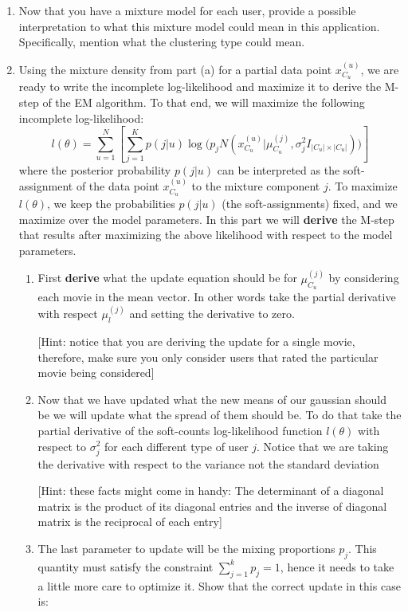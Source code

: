 \begin{enumerate}
\begin{enumerate}
 .


 \item Now that you have a mixture model for each user, provide a possible interpretation to what this mixture model could mean in this application. Specifically, mention what the clustering type could mean.

\item Using the mixture density from part (a) for a partial data point $x^{(u)}_{C_u}$, we are ready to write the incomplete log-likelihood and maximize it to derive the M-step of the EM algorithm.
To that end, we will maximize the following incomplete log-likelihood:
$$ l(\theta) = \sum_{u=1}^N \left[ \sum^{K}_{j=1} p(j|u) \log\bigl( p_j N(x^{(u)}_{C_u} | \mu^{(j)}_{C_u}, \sigma^2_j I_{|C_u| \times |C_u|} ) \bigr) \right]$$
where the posterior probability $p(j|u)$ can be interpreted as the soft-assignment of the data point $x^{(u)}_{C_u}$ to the mixture component $j$. To maximize $l( \theta)$, we keep the probabilities $p(j|u)$ (the soft-assignments) fixed, and we maximize over the model parameters. In this part we will \textbf{derive} the M-step that results after maximizing the above likelihood with respect to the model parameters.

\begin{enumerate}
\item  First {\bf derive } what the update equation should be for $\mu^{(j)}_{C_u}$ by considering each movie in the mean vector. In other words take the partial derivative with respect $\mu^{(j)}_{l}$ and setting the derivative to zero.

[Hint: notice that you are deriving the update for a single movie, therefore, make sure you only consider users that rated the particular movie being considered]
\item Now that we have updated what the new means of our gaussian should be we will update what the spread of them should be.
To do that take the partial derivative of the soft-counts log-likelihood function $l(\theta)$ with respect to $ \sigma^2_{j} $ for each different type of user $j$.
Notice that we are taking the derivative with respect to the variance not the standard deviation

[Hint: these facts might come in handy: The determinant of a diagonal matrix is the product of its diagonal entries and the inverse of diagonal matrix is the reciprocal of each entry]
\item The last parameter to update will be the mixing proportions $p_j$. This quantity must satisfy the constraint $ \sum^{k}_{j=1} p_j = 1$, hence it needs to take a little more care to optimize it. Show that the correct update in this case is:


\end{enumerate}
\end{enumerate}
\end{enumerate}
